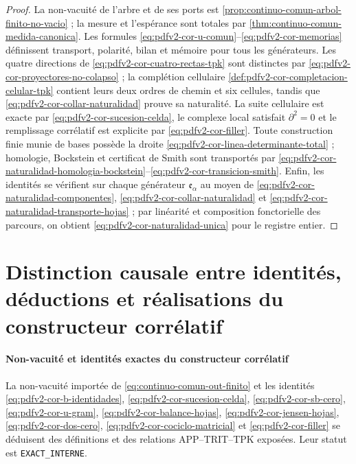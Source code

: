 \begin{proof}
La non-vacuité de l'arbre et de ses ports est \cref{prop:continuo-comun-arbol-finito-no-vacio} ; la mesure et l'espérance sont totales par \cref{thm:continuo-comun-medida-canonica}. Les formules \eqref{eq:pdfv2-cor-u-comun}--\eqref{eq:pdfv2-cor-memorias} définissent transport, polarité, bilan et mémoire pour tous les générateurs. Les quatre directions de \eqref{eq:pdfv2-cor-cuatro-rectas-tpk} sont distinctes par \eqref{eq:pdfv2-cor-proyectores-no-colapso} ; la complétion cellulaire \cref{def:pdfv2-cor-completacion-celular-tpk} contient leurs deux ordres de chemin et six cellules, tandis que \eqref{eq:pdfv2-cor-collar-naturalidad} prouve sa naturalité. La suite cellulaire est exacte par \eqref{eq:pdfv2-cor-sucesion-celda}, le complexe local satisfait \(\partial^2=0\) et le remplissage corrélatif est explicite par \eqref{eq:pdfv2-cor-filler}. Toute construction finie munie de bases possède la droite \eqref{eq:pdfv2-cor-linea-determinante-total} ; homologie, Bockstein et certificat de Smith sont transportés par \eqref{eq:pdfv2-cor-naturalidad-homologia-bockstein}--\eqref{eq:pdfv2-cor-transicion-smith}. Enfin, les identités se vérifient sur chaque générateur \(\mathfrak e_\alpha\) au moyen de \eqref{eq:pdfv2-cor-naturalidad-componentes}, \eqref{eq:pdfv2-cor-collar-naturalidad} et \eqref{eq:pdfv2-cor-naturalidad-transporte-hojas} ; par linéarité et composition fonctorielle des parcours, on obtient \eqref{eq:pdfv2-cor-naturalidad-unica} pour le registre entier.
\end{proof}

\section{Distinction causale entre identités, déductions et réalisations du constructeur corrélatif}

\paragraph{Non-vacuité et identités exactes du constructeur corrélatif}
La non-vacuité importée de \eqref{eq:continuo-comun-out-finito} et les identités \eqref{eq:pdfv2-cor-b-identidades}, \eqref{eq:pdfv2-cor-sucesion-celda}, \eqref{eq:pdfv2-cor-sb-cero}, \eqref{eq:pdfv2-cor-u-gram}, \eqref{eq:pdfv2-cor-balance-hojas}, \eqref{eq:pdfv2-cor-jensen-hojas}, \eqref{eq:pdfv2-cor-dos-cero}, \eqref{eq:pdfv2-cor-cociclo-matricial} et \eqref{eq:pdfv2-cor-filler} se déduisent des définitions et des relations APP--TRIT--TPK exposées. Leur statut est \texttt{EXACT\_INTERNE}.

